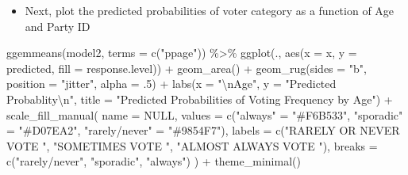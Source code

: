 \documentclass[
  letterpaper,
  DIV=11,
  numbers=noendperiod]{scrartcl}
\newenvironment{Shaded}{\begin{snugshade}}{\end{snugshade}}
\newcommand{\AttributeTok}[1]{\textcolor[rgb]{0.40,0.45,0.13}{#1}}
\newcommand{\ConstantTok}[1]{\textcolor[rgb]{0.56,0.35,0.01}{#1}}
\newcommand{\DecValTok}[1]{\textcolor[rgb]{0.68,0.00,0.00}{#1}}
\newcommand{\FunctionTok}[1]{\textcolor[rgb]{0.28,0.35,0.67}{#1}}
\newcommand{\NormalTok}[1]{\textcolor[rgb]{0.00,0.23,0.31}{#1}}
\newcommand{\OtherTok}[1]{\textcolor[rgb]{0.00,0.23,0.31}{#1}}
\newcommand{\SpecialCharTok}[1]{\textcolor[rgb]{0.37,0.37,0.37}{#1}}
\newcommand{\StringTok}[1]{\textcolor[rgb]{0.13,0.47,0.30}{#1}}
\providecommand{\tightlist}{%
  \setlength{\itemsep}{0pt}\setlength{\parskip}{0pt}}\usepackage{longtable,booktabs,array}
\begin{document}
\begin{itemize}
\tightlist
\item
  Next, plot the predicted probabilities of voter category as a function
  of Age and Party ID
\end{itemize}

\begin{Shaded}
\begin{Highlighting}[]
  \FunctionTok{ggemmeans}\NormalTok{(model2, }\AttributeTok{terms =} \FunctionTok{c}\NormalTok{(}\StringTok{"ppage"}\NormalTok{)) }\SpecialCharTok{\%\textgreater{}\%} 
      \FunctionTok{ggplot}\NormalTok{(., }\FunctionTok{aes}\NormalTok{(}\AttributeTok{x =}\NormalTok{ x, }\AttributeTok{y =}\NormalTok{ predicted, }\AttributeTok{fill =}\NormalTok{ response.level)) }\SpecialCharTok{+}
      \FunctionTok{geom\_area}\NormalTok{() }\SpecialCharTok{+} 
      \FunctionTok{geom\_rug}\NormalTok{(}\AttributeTok{sides =} \StringTok{"b"}\NormalTok{, }\AttributeTok{position =} \StringTok{"jitter"}\NormalTok{, }\AttributeTok{alpha =}\NormalTok{ .}\DecValTok{5}\NormalTok{) }\SpecialCharTok{+} 
      \FunctionTok{labs}\NormalTok{(}\AttributeTok{x =} \StringTok{"}\SpecialCharTok{\textbackslash{}n}\StringTok{Age"}\NormalTok{, }\AttributeTok{y =} \StringTok{"Predicted Probablity}\SpecialCharTok{\textbackslash{}n}\StringTok{"}\NormalTok{, }\AttributeTok{title =} \StringTok{"Predicted Probabilities of Voting Frequency by Age"}\NormalTok{) }\SpecialCharTok{+}
      \FunctionTok{scale\_fill\_manual}\NormalTok{(}
        \AttributeTok{name =} \ConstantTok{NULL}\NormalTok{,}
        \AttributeTok{values =} \FunctionTok{c}\NormalTok{(}\StringTok{"always"} \OtherTok{=} \StringTok{"\#F6B533"}\NormalTok{, }\StringTok{"sporadic"} \OtherTok{=} \StringTok{"\#D07EA2"}\NormalTok{, }\StringTok{"rarely/never"} \OtherTok{=} \StringTok{"\#9854F7"}\NormalTok{),}
        \AttributeTok{labels =} \FunctionTok{c}\NormalTok{(}\StringTok{"RARELY OR NEVER VOTE    "}\NormalTok{, }\StringTok{"SOMETIMES VOTE    "}\NormalTok{, }\StringTok{"ALMOST ALWAYS VOTE    "}\NormalTok{),}
        \AttributeTok{breaks =} \FunctionTok{c}\NormalTok{(}\StringTok{"rarely/never"}\NormalTok{, }\StringTok{"sporadic"}\NormalTok{, }\StringTok{"always"}\NormalTok{)}
\NormalTok{      ) }\SpecialCharTok{+}
      \FunctionTok{theme\_minimal}\NormalTok{()}
\end{Highlighting}
\end{Shaded}
\end{document}
